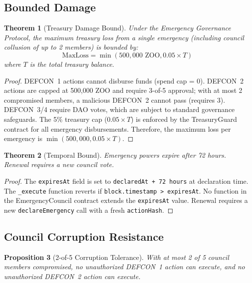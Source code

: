 \documentclass[11pt,letterpaper]{article}
\newtheorem{theorem}{Theorem}[section]
\newtheorem{proposition}[theorem]{Proposition}
\begin{document}
\subsection{Bounded Damage}

\begin{theorem}[Treasury Damage Bound]
Under the Emergency Governance Protocol, the maximum treasury loss from a single emergency (including council collusion of up to 2 members) is bounded by:
\begin{equation}
    \text{MaxLoss} = \min(500{,}000 \text{ ZOO}, 0.05 \times T)
\end{equation}
where $T$ is the total treasury balance.
\end{theorem}

\begin{proof}
DEFCON~1 actions cannot disburse funds (spend cap = 0). DEFCON~2 actions are capped at 500{,}000 ZOO and require 3-of-5 approval; with at most 2 compromised members, a malicious DEFCON~2 cannot pass (requires 3). DEFCON~3/4 require DAO votes, which are subject to standard governance safeguards. The 5\% treasury cap ($0.05 \times T$) is enforced by the TreasuryGuard contract for all emergency disbursements. Therefore, the maximum loss per emergency is $\min(500{,}000, 0.05 \times T)$.
\end{proof}

\begin{theorem}[Temporal Bound]
Emergency powers expire after 72 hours. Renewal requires a new council vote.
\end{theorem}

\begin{proof}
The \texttt{expiresAt} field is set to \texttt{declaredAt + 72 hours} at declaration time. The \texttt{\_execute} function reverts if \texttt{block.timestamp > expiresAt}. No function in the EmergencyCouncil contract extends the \texttt{expiresAt} value. Renewal requires a new \texttt{declareEmergency} call with a fresh \texttt{actionHash}.
\end{proof}

\subsection{Council Corruption Resistance}

\begin{proposition}[2-of-5 Corruption Tolerance]
With at most 2 of 5 council members compromised, no unauthorized DEFCON~1 action can execute, and no unauthorized DEFCON~2 action can execute.
\end{proposition}
\end{document}
